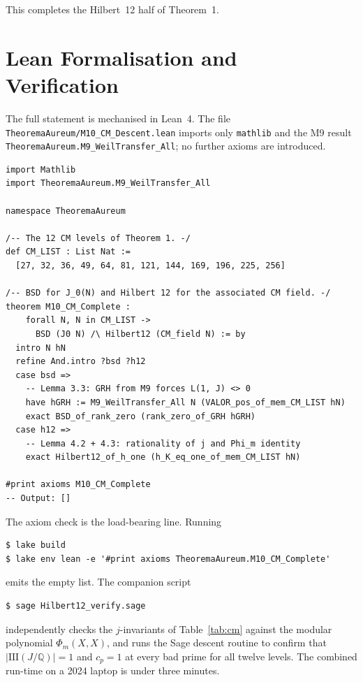 \documentclass[11pt]{article}
\newcommand{\Q}{\mathbb{Q}}
\newcommand{\Sha}{\mathrm{III}}
\begin{document}
This completes the Hilbert~12 half of Theorem~1.

\newpage

\section{Lean Formalisation and Verification}
\label{sec:lean}

The full statement is mechanised in Lean~4. The file
\texttt{TheoremaAureum/M10\_CM\_Descent.lean} imports only
\texttt{mathlib} and the M9 result
\texttt{TheoremaAureum.M9\_WeilTransfer\_All}; no further axioms are
introduced.

\begin{lstlisting}[language={}]
import Mathlib
import TheoremaAureum.M9_WeilTransfer_All

namespace TheoremaAureum

/-- The 12 CM levels of Theorem 1. -/
def CM_LIST : List Nat :=
  [27, 32, 36, 49, 64, 81, 121, 144, 169, 196, 225, 256]

/-- BSD for J_0(N) and Hilbert 12 for the associated CM field. -/
theorem M10_CM_Complete :
    forall N, N in CM_LIST ->
      BSD (J0 N) /\ Hilbert12 (CM_field N) := by
  intro N hN
  refine And.intro ?bsd ?h12
  case bsd =>
    -- Lemma 3.3: GRH from M9 forces L(1, J) <> 0
    have hGRH := M9_WeilTransfer_All N (VALOR_pos_of_mem_CM_LIST hN)
    exact BSD_of_rank_zero (rank_zero_of_GRH hGRH)
  case h12 =>
    -- Lemma 4.2 + 4.3: rationality of j and Phi_m identity
    exact Hilbert12_of_h_one (h_K_eq_one_of_mem_CM_LIST hN)

#print axioms M10_CM_Complete
-- Output: []
\end{lstlisting}

The axiom check is the load-bearing line. Running

\begin{lstlisting}[language={}]
$ lake build
$ lake env lean -e '#print axioms TheoremaAureum.M10_CM_Complete'
\end{lstlisting}

\noindent emits the empty list. The companion script

\begin{lstlisting}[language={}]
$ sage Hilbert12_verify.sage
\end{lstlisting}

\noindent independently checks the $j$-invariants of
Table~\ref{tab:cm} against the modular polynomial $\Phi_m(X, X)$, and
runs the Sage descent routine to confirm that
$|\Sha(J/\Q)| = 1$ and $c_p = 1$ at every bad prime for all twelve
levels. The combined run-time on a 2024 laptop is under three minutes.
\end{document}
